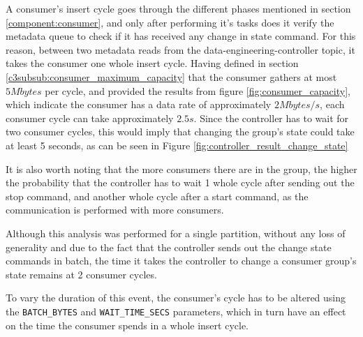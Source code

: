 A consumer's insert cycle goes through the different phases mentioned in section
\ref{component:consumer}, and only after performing it's tasks does it verify
the metadata queue to check if it has received any change in state command. For
this reason, between two metadata reads from the data-engineering-controller
topic, it takes the consumer one whole insert cycle. Having defined in section
\ref{c3subsub:consumer_maximum_capacity} that the consumer gathers at most
$5Mbytes$ per cycle, and provided the results from figure
\ref{fig:consumer_capacity}, which indicate the consumer has a data rate of
approximately $2Mbytes/s$, each consumer cycle can take approximately $2.5s$.
Since the controller has to wait for two consumer cycles, this would imply that
changing the group's state could take at least 5 seconds, as can be seen in Figure
\ref{fig:controller_result_change_state}

It is also worth noting that the more consumers there are in the group, the
higher the probability that the controller has to wait 1 whole cycle after
sending out the stop command, and another whole cycle after a start command, as
the communication is performed with more consumers.

Although this analysis was performed for a single partition, without any loss of
generality and due to the fact that the controller sends out the change state
commands in batch, the time it takes the controller to change a consumer group's
state remains at 2 consumer cycles.

To vary the duration of this event, the consumer's cycle has to be altered using
the \lstinline{BATCH_BYTES} and \lstinline{WAIT_TIME_SECS} parameters, which in
turn have an effect on the time the consumer spends in a whole insert cycle.
